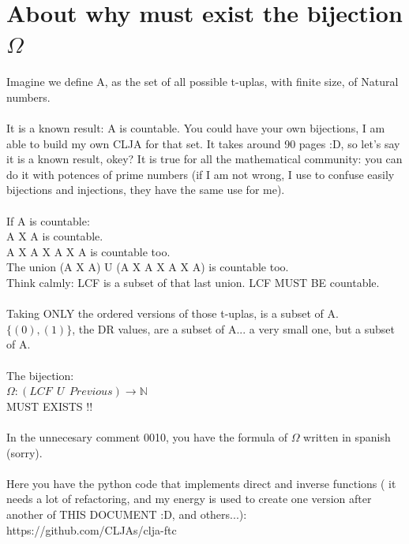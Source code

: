 \chapter{About why must exist the bijection $\Omega$}

	\noindent
	Imagine we define A, as the set of all possible t-uplas, with finite size, of Natural numbers.
	\\\\
	
	\noindent
	It is a known result: A is countable. You could have your own bijections, I am able to build my own CLJA for that set. It takes around 90 pages :D, so let's say it is a known result, okey? It is true for all the mathematical community: you can do it with potences of prime numbers (if I am not wrong, I use to confuse easily bijections and injections, they have the same use for me).
	\\\\
	
	\noindent
	If A is countable:\\
	A X A  is countable.\\
	A X A X A X A is countable too.\\
	The union (A X A) U (A X A X A X A) is countable too.\\
	Think calmly: LCF is a subset of that last union. LCF MUST BE countable.
	\\\\
	
	\noindent
	Taking ONLY the ordered versions of those t-uplas, is a subset of A.\\
	$\{ (0), (1) \}$, the DR values, are a subset of A... a very small one, but a subset of A.
	\\\\
	
	\noindent
	The bijection:\\
	$\Omega: (LCF \:\: U \:\: Previous) \rightarrow \mathbb{N}$\\
	MUST EXISTS !!
	\\\\
	
	\noindent
	In the unnecesary comment 0010, you have the formula of $\Omega$ written in spanish (sorry).
	\\\\
	
	\noindent
	Here you have the python code that implements direct and inverse functions ( it needs a lot of refactoring, and my energy is used to create one version after another of THIS DOCUMENT :D, and others...):\\
	https://github.com/CLJAs/clja-ftc
	\\\\
	
